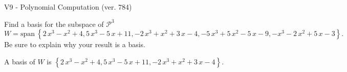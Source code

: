 \begin{exercise}
  \begin{exerciseTitle}V9 - Polynomial Computation (ver. 784)\end{exerciseTitle}
  \begin{exerciseStatement}
    Find a basis for the subspace of \(\mathcal{P}^3\) 
\[W=\mathrm{span}\ \left\{2 \, x^{3} - x^{2} + 4 , 5 \, x^{3} - 5 \, x + 11 , -2 \, x^{3} + x^{2} + 3 \, x - 4 , -5 \, x^{3} + 5 \, x^{2} - 5 \, x - 9 , -x^{3} - 2 \, x^{2} + 5 \, x - 3\right\}.\]
 Be sure to explain why your result is a basis.


  \end{exerciseStatement}
  \begin{exerciseAnswer}
   A basis of \(W\) is  \(\left\{2 \, x^{3} - x^{2} + 4 , 5 \, x^{3} - 5 \, x + 11 , -2 \, x^{3} + x^{2} + 3 \, x - 4\right\}\).
  


  \end{exerciseAnswer}
\end{exercise}